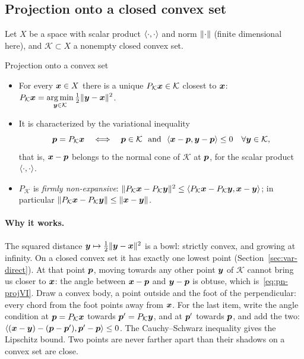 \subsection{Projection onto a closed convex set}\label{ssec:pn-proj}
%
Let $X$ be a space with scalar product $\langle \cdot,\cdot\rangle$ and norm
$\lVert \cdot\rVert$ (finite dimensional here), and $\mathcal K\subset X$ a nonempty
closed convex set.
\begin{gbox}{Projection onto a convex set}
\begin{itemize}
  \item For every $\bm{x}\in X$ there is a unique $P_{\mathcal K}\bm{x}\in\mathcal K$ closest to $\bm{x}$:
  $\displaystyle P_{\mathcal K}\bm{x}=\operatorname*{arg\,min}_{\bm{y}\in\mathcal K}\tfrac12\lVert \bm{y}-\bm{x}\rVert^2$.
  \item It is characterized by the variational inequality
  \begin{equation}\label{eq:pn-projVI}
    \vp=P_{\mathcal K}\vx\quad\Longleftrightarrow\quad
    \vp\in\mathcal K\ \text{ and }\ \scal{\vx-\vp}{\vy-\vp}\le0\quad\forall\vy\in\mathcal K,
  \end{equation}
  that is, $\bm{x}-\bm{p}$ belongs to the normal cone of $\mathcal K$ at $\bm{p}$, for the
  scalar product $\langle \cdot,\cdot\rangle$.
  \item $P_{\mathcal K}$ is \emph{firmly non-expansive}:
  $\lVert P_{\mathcal K}\bm{x}-P_{\mathcal K}\bm{y}\rVert^2\le\langle P_{\mathcal K}\bm{x}-P_{\mathcal K}\bm{y},\bm{x}-\bm{y}\rangle$; in particular
  $\lVert P_{\mathcal K}\bm{x}-P_{\mathcal K}\bm{y}\rVert\le\lVert \bm{x}-\bm{y}\rVert$.
\end{itemize}
\end{gbox}
\paragraph{Why it works.} The squared distance
$\bm{y}\mapsto\tfrac12\lVert \bm{y}-\bm{x}\rVert^2$ is a bowl: strictly convex, and growing
at infinity. On a closed convex set it has exactly one lowest point
(Section~\ref{sec:var-direct}). At that point $\bm{p}$, moving towards any other
point $\bm{y}$ of $\mathcal K$ cannot bring us closer to $\bm{x}$: the angle between
$\bm{x}-\bm{p}$ and $\bm{y}-\bm{p}$ is obtuse, which is~\eqref{eq:pn-projVI}. Draw a
convex body, a point outside and the foot of the perpendicular: every chord
from the foot points away from $\bm{x}$. For the last item, write the angle
condition at $\bm{p}=P_{\mathcal K}\bm{x}$ towards $\bm{p}'=P_{\mathcal K}\bm{y}$, and at
$\bm{p}'$ towards $\bm{p}$, and add the two:
$\langle (\bm{x}-\bm{y})-(\bm{p}-\bm{p}'),\bm{p}'-\bm{p}\rangle\le0$. The Cauchy--Schwarz inequality
gives the Lipschitz bound. Two points are never farther apart than their
shadows on a convex set are close.

